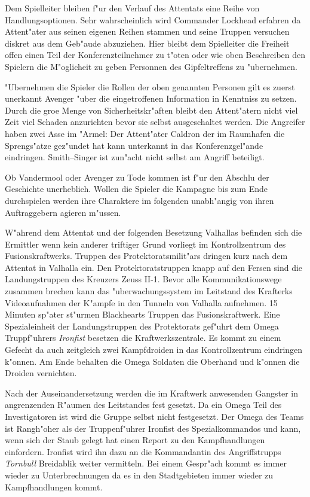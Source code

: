 \begin{remarks}
	Dem Spielleiter bleiben f"ur den Verlauf des Attentats eine Reihe von Handlungsoptionen. Sehr wahrscheinlich wird Commander Lockhead erfahren da\3 Attent"ater aus seinen eigenen Reihen stammen und seine Truppen versuchen diskret aus dem Geb"aude abzuziehen. Hier bleibt dem Spielleiter die Freiheit offen einen Teil der Konferenzteilnehmer zu t"oten oder wie oben Beschreiben den Spielern die M"oglicheit zu geben Personnen des Gipfeltreffens zu "ubernehmen.
	
	"Ubernehmen die Spieler die Rollen der oben genannten Personen gilt es zuerst unerkannt Avenger "uber die eingetroffenen Information in Kenntniss zu setzen. Durch die gro\3e Menge von Sicherheitskr"aften bleibt den Attent"atern nicht viel Zeit viel Schaden anzurichten bevor sie selbst ausgeschaltet werden. Die Angreifer haben zwei Asse im "Armel: Der Attent"ater Caldron der im Raumhafen die Sprengs"atze gez"undet hat kann unterkannt in das Konferenzgel"ande eindringen. Smith--Singer ist zun"acht nicht selbst am Angriff beteiligt.
	
	Ob Vandermool oder Avenger zu Tode kommen ist f"ur den Abschlu\3 der Geschichte unerheblich. Wollen die Spieler die Kampagne bis zum Ende durchspielen werden ihre Charaktere im folgenden unabh"angig von ihren Auftraggebern agieren m"ussen.
\end{remarks}



W"ahrend dem Attentat und der folgenden Besetzung Valhallas befinden sich die Ermittler wenn kein anderer triftiger Grund vorliegt im Kontrollzentrum des Fusionskraftwerks. Truppen des Protektoratsmilit"ars dringen kurz nach dem Attentat in Valhalla ein. Den Protektoratstruppen knapp auf den Fersen sind die Landungstruppen des Kreuzers Zeuss II-1. Bevor alle Kommunikationswege zusammen brechen kann das "uberwachungssystem im Leitstand des Krafterks Videoaufnahmen der K"ampfe in den Tunneln von Valhalla aufnehmen. 15 Minuten sp"ater st"urmen Blackhearts Truppen das Fusionskraftwerk. Eine Spezialeinheit der Landungstruppen des Protektorats gef"uhrt dem Omega Truppf"uhrers \emph{Ironfist} besetzen die Kraftwerkszentrale. Es kommt zu einem Gefecht da auch zeitgleich zwei Kampfdroiden in das Kontrollzentrum eindringen k"onnen. Am Ende behalten die Omega Soldaten die Oberhand und k"onnen die Droiden vernichten. 

Nach der Auseinandersetzung werden die im Kraftwerk anwesenden Gangster in angrenzenden R"aumen des Leitstandes fest gesetzt. Da ein Omega Teil des Investigatoren ist wird die Gruppe selbst nicht festgesetzt. Der Omega des Teams ist Rangh"oher als der Truppenf"uhrer Ironfist des Spezialkommandos und kann, wenn sich der Staub gelegt hat einen Report zu den Kampfhandlungen einfordern. Ironfist wird ihn dazu an die Kommandantin des Angriffstrupps \emph{Tornbull} Breidablik weiter vermitteln. Bei einem Gespr"ach kommt es immer wieder zu Unterbrechnungen da es in den Stadtgebieten immer wieder zu Kampfhandlungen kommt.

